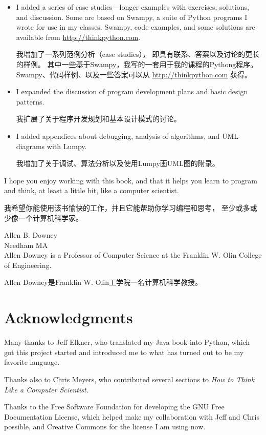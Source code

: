 \documentclass[10pt]{book}
\begin{document}
\begin{CJK}{UTF8}{gbsn}
\begin{itemize}
\item I added a series of case studies---longer examples with
  exercises, solutions, and discussion.  Some are based on
  Swampy, a suite of Python programs I wrote for use in my classes.
  Swampy, code examples, and some solutions are available from
  \url{http://thinkpython.com}.
  
我增加了一系列范例分析（case studies），
即具有联系、答案以及讨论的更长的样例。
其中一些基于Swampy，我写的一套用于我的课程的Pythong程序。
Swampy、代码样例、以及一些答案可以从 \url{http://thinkpython.com} 获得。

\item I expanded the discussion of program development plans
  and basic design patterns.

我扩展了关于程序开发规划和基本设计模式的讨论。

\item I added appendices about debugging, analysis of algorithms, and
  UML diagrams with Lumpy.

我增加了关于调试、算法分析以及使用Lumpy画UML图的附录。

\end{itemize}

I hope you enjoy working with this book, and that it helps
you learn to program and think, at least a little bit, like
a computer scientist.

我希望你能使用该书愉快的工作，并且它能帮助你学习编程和思考，
至少或多或少像一个计算机科学家。

Allen B. Downey \\
Needham MA\\

Allen Downey is a Professor of Computer Science at 
the Franklin W. Olin College of Engineering.

Allen Downey是Franklin W. Olin工学院一名计算机科学教授。

\section*{Acknowledgments}

Many thanks to Jeff Elkner, who
translated my Java book into Python, which got this project
started and introduced me to what has turned out to be my
favorite language.

Thanks also to Chris Meyers, who contributed several sections
to {\em How to Think Like a Computer Scientist}.

Thanks to the Free Software Foundation for developing
the GNU Free Documentation License, which helped make
my collaboration with Jeff and Chris possible, and Creative
Commons for the license I am using now.


\end{CJK}
\end{document}
